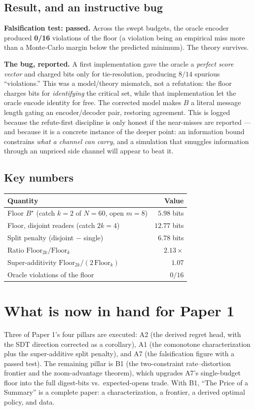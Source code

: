 \documentclass[11pt,a4paper]{article}
\begin{document}
\subsection{Result, and an instructive bug}


\noindent\textbf{Falsification test: passed.} Across the swept budgets, the oracle encoder produced \textbf{0/16} violations of the floor (a violation being an empirical miss more than a Monte-Carlo margin below the predicted minimum). The theory survives.

\noindent\textbf{The bug, reported.} A first implementation gave the oracle a \emph{perfect score vector} and charged bits only for tie-resolution, producing $8/14$ spurious ``violations.'' This was a model/theory mismatch, not a refutation: the floor charges bits for \emph{identifying} the critical set, while that implementation let the oracle encode identity for free. The corrected model makes $B$ a literal message length gating an encoder/decoder pair, restoring agreement. This is logged because the refute-first discipline is only honest if the near-misses are reported --- and because it is a concrete instance of the deeper point: an information bound constrains \emph{what a channel can carry}, and a simulation that smuggles information through an unpriced side channel will appear to beat it.

\subsection{Key numbers}
\begin{center}
\begin{tabular}{@{}lr@{}}
\toprule
Quantity & Value \\
\midrule
Floor $B^\star$ (catch $k=2$ of $N=60$, open $m=8$) & $5.98$ bits \\
Floor, disjoint readers (catch $2k=4$) & $12.77$ bits \\
Split penalty (disjoint $-$ single) & $6.78$ bits \\
Ratio $\mathrm{Floor}_{2k}/\mathrm{Floor}_{k}$ & $2.13\times$ \\
Super-additivity $\mathrm{Floor}_{2k}/(2\,\mathrm{Floor}_{k})$ & $1.07$ \\
Oracle violations of the floor & $0/16$ \\
\bottomrule
\end{tabular}
\end{center}

\section{What is now in hand for Paper 1}
Three of Paper 1's four pillars are executed: A2 (the derived regret head, with the SDT direction corrected as a corollary), A1 (the comonotone characterization plus the super-additive split penalty), and A7 (the falsification figure with a passed test). The remaining pillar is B1 (the two-constraint rate--distortion frontier and the zoom-advantage theorem), which upgrades A7's single-budget floor into the full digest-bits vs.\ expected-opens trade. With B1, ``The Price of a Summary'' is a complete paper: a characterization, a frontier, a derived optimal policy, and data.
\end{document}

